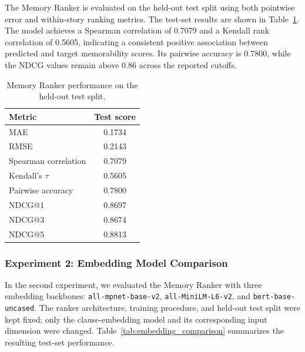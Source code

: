 \documentclass[conference]{IEEEtran}
\renewcommand{\arraystretch}{0.9}
\begin{document}
The Memory Ranker is evaluated on the held-out test split using both pointwise error and within-story ranking metrics. The test-set results are shown in Table~\ref{tab:memory_ranker_test}. The model achieves a Spearman correlation of 0.7079 and a Kendall rank correlation of 0.5605, indicating a consistent positive association between predicted and target memorability scores. Its pairwise accuracy is 0.7800, while the NDCG values remain above 0.86 across the reported cutoffs.

\begin{table}[H]
\centering
\caption{Memory Ranker performance on the held-out test split.}
\label{tab:memory_ranker_test}
\footnotesize
\renewcommand{\arraystretch}{1.1}
\begin{tabular}{lc}
\hline
\textbf{Metric} & \textbf{Test score} \\
\hline
MAE & 0.1734 \\
RMSE & 0.2143 \\
Spearman correlation & 0.7079 \\
Kendall's $\tau$ & 0.5605 \\
Pairwise accuracy & 0.7800 \\
NDCG@1 & 0.8697 \\
NDCG@3 & 0.8674 \\
NDCG@5 & 0.8813 \\
\hline
\end{tabular}
\end{table}

\subsubsection{Experiment 2: Embedding Model Comparison}

In the second experiment, we evaluated the Memory Ranker with three embedding backbones: \texttt{all-mpnet-base-v2}, \texttt{all-MiniLM-L6-v2}, and \texttt{bert-base-uncased}. The ranker architecture, training procedure, and held-out test split were kept fixed; only the clause-embedding model and its corresponding input dimension were changed. Table~\ref{tab:embedding_comparison} summarizes the resulting test-set performance.
\end{document}
